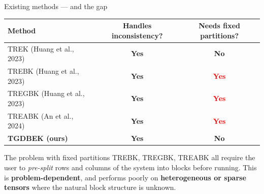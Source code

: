 \documentclass[aspectratio=169,10pt]{beamer}
\newcommand{\highlight}[1]{\textcolor{accent}{\textbf{#1}}}
\begin{document}
\begin{frame}{Existing methods — and the gap}

  \begin{center}
  \small
  \begin{tabular}{lcc}
    \toprule
    Method & Handles inconsistency? & Needs fixed partitions? \\
    \midrule
    TREK  (Huang et al., 2023)   & \textcolor{green!60!black}{\textbf{Yes}} & \textcolor{green!60!black}{\textbf{No}} \\
    TREBK (Huang et al., 2023)   & \textcolor{green!60!black}{\textbf{Yes}} & \textcolor{red}{\textbf{Yes}} \\
    TREGBK (Huang et al., 2023)  & \textcolor{green!60!black}{\textbf{Yes}} & \textcolor{red}{\textbf{Yes}} \\
    TREABK (An et al., 2024)     & \textcolor{green!60!black}{\textbf{Yes}} & \textcolor{red}{\textbf{Yes}} \\
    \midrule
    \highlight{TGDBEK (ours)}    & \textcolor{green!60!black}{\textbf{Yes}} & \textcolor{green!60!black}{\textbf{No}} \\
    \bottomrule
  \end{tabular}
  \end{center}

  \bigskip
  \begin{alertblock}{The problem with fixed partitions}
    TREBK, TREGBK, TREABK all require the user to \emph{pre-split} rows and
    columns of the system into blocks before running.  This is
    \textbf{problem-dependent}, and performs poorly on \textbf{heterogeneous or
    sparse tensors} where the natural block structure is unknown.
  \end{alertblock}

\end{frame}
\end{document}
